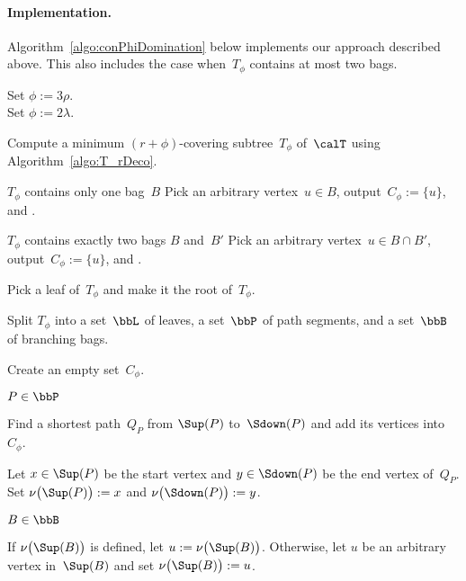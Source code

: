 \paragraph{Implementation.}
Algorithm~\ref{algo:conPhiDomination} below implements our approach described above.
This also includes the case when~$T_\phi$ contains at most two bags.


\begin{algorithm}
    [!htb]
    \caption
    {%
        Computes \rHrt~a connected $(r + 5 \rho)$-dominating set or \rDmd~a connected $(r + 3 \lambda)$-dominating set for a given graph~$G$ with a given tree-decomposition~$\calT$ with breadth~$\rho$ and length~$\lambda$.
    }
    \label{algo:conPhiDomination}

\parbox[t]{\hsize}
{%
    \rHrt Set $\phi := 3 \rho$. \\
    \rDmd Set $\phi := 2 \lambda$.
}

Compute a minimum $(r + \phi)$-covering subtree~$T_\phi$ of~$\calT$ using Algorithm~\ref{algo:T_rDeco}.
\label{line:compTphi}

\If
{%
    \( T_\phi \) contains only one bag~\( B \)%
    \label{line:ifTphiOneBag}
}
{%
    Pick an arbitrary vertex~$u \in B$, output~$C_\phi := \{ u \}$, and \KwStop.
}

\If
{%
    \( T_\phi \) contains exactly two bags \( B \) and~\( B' \)
}
{%
    Pick an arbitrary vertex~$u \in B \cap B'$, output~$C_\phi := \{ u \}$, and \KwStop.
    \label{line:TphiTwoBags}
}

Pick a leaf of~$T_\phi$ and make it the root of~$T_\phi$.
\label{line:rootTphi}

Split $T_\phi$ into a set~$\bbL$ of leaves, a set~$\bbP$ of path segments, and a set~$\bbB$ of branching bags.
\label{line:splitTphi}

Create an empty set~$C_\phi$.

\ForEach
{%
    \( P \in \bbP \)
}
{%
    Find a shortest path~$Q_P$ from $\Sup(P)$ to~$\Sdown(P)$ and add its vertices into~$C_\phi$.
    \label{line:pathSegFindQ}

    Let $x \in \Sup(P)$ be the start vertex and $y \in \Sdown(P)$ be the end vertex of~$Q_P$.
    Set $\nu \big( \Sup(P) \big) := x$ and $\nu \big( \Sdown(P) \big) := y$.
    \label{line:pathSegSep}
}

\ForEach
{%
    \( B \in \bbB \)%
    \label{line:loopBranchBag}
}
{%
    If $\nu \big( \Sup(B) \big)$ is defined, let $u := \nu \big( \Sup(B) \big)$.
    Otherwise, let $u$ be an arbitrary vertex in~$\Sup(B)$ and set $\nu \big( \Sup(B) \big) := u$.

}
\end{algorithm}
